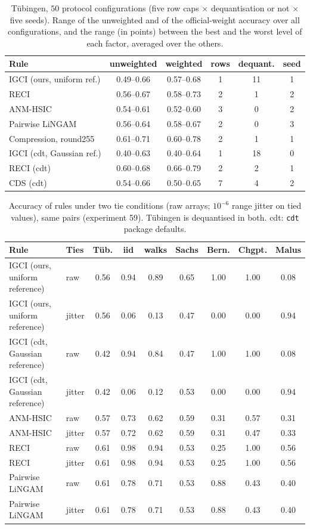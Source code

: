 \begin{table}[ht]
\caption{T\"ubingen, $50$ protocol configurations (five row caps $\times$ dequantisation or not $\times$ five seeds). Range of the unweighted and of the official-weight accuracy over all configurations, and the range (in points) between the best and the worst level of each factor, averaged over the others.}
\label{tab:protocol}
\small
\begin{tabular}{@{}lccccc@{}}
\toprule
Rule & unweighted & weighted & rows & dequant. & seed\\
\midrule
IGCI (ours, uniform ref.) & 0.49--0.66 & 0.57--0.68 & 1 & 11 & 1\\
RECI & 0.56--0.67 & 0.58--0.73 & 2 & 1 & 2\\
ANM-HSIC & 0.54--0.61 & 0.52--0.60 & 3 & 0 & 2\\
Pairwise LiNGAM & 0.56--0.64 & 0.58--0.67 & 2 & 0 & 3\\
Compression, round255 & 0.61--0.71 & 0.60--0.78 & 2 & 1 & 1\\
IGCI (cdt, Gaussian ref.) & 0.40--0.63 & 0.40--0.64 & 1 & 18 & 0\\
RECI (cdt) & 0.60--0.68 & 0.66--0.79 & 2 & 2 & 1\\
CDS (cdt) & 0.54--0.66 & 0.50--0.65 & 7 & 4 & 2\\
\bottomrule
\end{tabular}
\end{table}

\begin{table}[ht]
\caption{Accuracy of rules under two tie conditions (raw arrays; $10^{-6}$ range jitter on tied values), same pairs (experiment 59). T\"ubingen is dequantised in both. cdt: \texttt{cdt} package defaults.}
\label{tab:ties}
\small
\setlength{\tabcolsep}{3pt}
\begin{tabular}{@{}llccccccc@{}}
\toprule
Rule & Ties & T\"ub. & iid & walks & Sachs & Bern. & Chgpt. & Malus\\
\midrule
IGCI (ours, uniform reference) & raw & 0.56 & 0.94 & 0.89 & 0.65 & 1.00 & 1.00 & 0.08\\
IGCI (ours, uniform reference) & jitter & 0.56 & 0.06 & 0.13 & 0.47 & 0.00 & 0.00 & 0.94\\
IGCI (cdt, Gaussian reference) & raw & 0.42 & 0.94 & 0.84 & 0.47 & 1.00 & 1.00 & 0.08\\
IGCI (cdt, Gaussian reference) & jitter & 0.42 & 0.06 & 0.12 & 0.53 & 0.00 & 0.00 & 0.94\\
ANM-HSIC & raw & 0.57 & 0.73 & 0.62 & 0.59 & 0.31 & 0.57 & 0.31\\
ANM-HSIC & jitter & 0.57 & 0.72 & 0.62 & 0.59 & 0.31 & 0.47 & 0.33\\
RECI & raw & 0.61 & 0.98 & 0.94 & 0.53 & 0.25 & 1.00 & 0.56\\
RECI & jitter & 0.61 & 0.98 & 0.94 & 0.53 & 0.25 & 1.00 & 0.56\\
Pairwise LiNGAM & raw & 0.61 & 0.78 & 0.71 & 0.53 & 0.88 & 0.43 & 0.40\\
Pairwise LiNGAM & jitter & 0.61 & 0.78 & 0.71 & 0.53 & 0.88 & 0.43 & 0.40\\
\bottomrule
\end{tabular}
\end{table}

